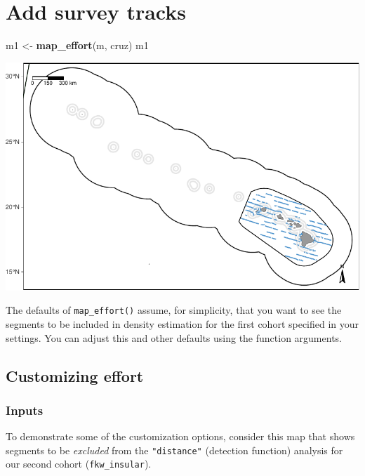 \documentclass[
]{book}
\newenvironment{Shaded}{\begin{snugshade}}{\end{snugshade}}
\newcommand{\KeywordTok}[1]{\textcolor[rgb]{0.13,0.29,0.53}{\textbf{#1}}}
\newcommand{\NormalTok}[1]{#1}
\newcommand{\StringTok}[1]{\textcolor[rgb]{0.31,0.60,0.02}{#1}}
\begin{document}
\hypertarget{add-survey-tracks}{%
\section*{Add survey tracks}\label{add-survey-tracks}}

\begin{Shaded}
\begin{Highlighting}[]
\NormalTok{m1 <-}\StringTok{ }\KeywordTok{map_effort}\NormalTok{(m, cruz)}
\NormalTok{m1}
\end{Highlighting}
\end{Shaded}

\includegraphics{figures/unnamed-chunk-58-1.pdf}

The defaults of \texttt{map\_effort()} assume, for simplicity, that you want to see the segments to be included in density estimation for the first cohort specified in your settings. You can adjust this and other defaults using the function arguments.

\hypertarget{customizing-effort}{%
\subsection*{Customizing effort}\label{customizing-effort}}

\hypertarget{inputs}{%
\subsubsection*{Inputs}\label{inputs}}

To demonstrate some of the customization options, consider this map that shows segments to be \emph{excluded} from the \texttt{"distance"} (detection function) analysis for our second cohort (\texttt{fkw\_insular}).
\end{document}
